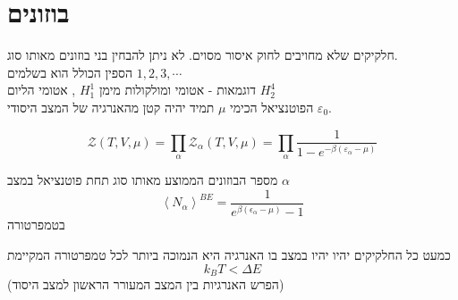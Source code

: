 \section{בוזונים}
חלקיקים שלא מחויבים לחוק איסור מסוים. 
לא ניתן להבחין בני בוזונים מאותו סוג.\\
הספין הכולל הוא בשלמים $1,2,3,\cdots$\\
דוגמאות - אטומי ומולקולות מימן $H^1_1$ , אטומי הליום $H^4_2$ \\
הפוטנציאל הכימי $\mu$ תמיד יהיה קטן מהאנרגיה של המצב היסודי $\varepsilon_0$.
\\
\begin{cheatformula}
$$\mathcal{Z}\left(T,V,\mu\right) = \prod_\alpha \mathcal{Z}_\alpha \left(T,V,\mu\right) = \prod_\alpha \frac{1}{1-e^{-\beta \left( \varepsilon_\alpha - \mu \right)}}$$
\end{cheatformula}

\begin{cheatformula}
מספר הבוזונים הממוצע מאותו סוג תחת פוטנציאל במצב $\alpha$ 
    $$\left<N_\alpha \right>^{BE} = \frac{1}{e^{\beta \left(\epsilon_\alpha -\mu \right) }-1}$$
בטמפרטורה
\end{cheatformula}
\begin{cheatformula}
כמעט כל החלקיקים יהיו יהיו במצב בו האנרגיה היא הנמוכה ביותר לכל טמפרטורה המקיימת
$$k_B T < \Delta E$$
(הפרש האנרגיות בין המצב המעורר הראשון למצב היסוד)

\end{cheatformula}

